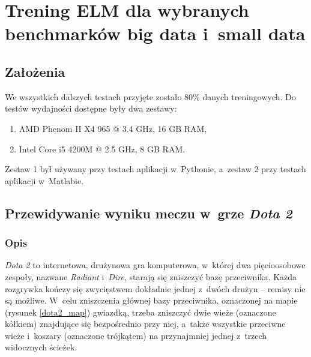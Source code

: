 \documentclass{article}
\begin{document}
\section{Trening ELM dla wybranych benchmarków big data i~small data}
\subsection{Założenia}
We wszystkich dalszych testach przyjęte zostało 80\% danych treningowych. Do testów wydajności dostępne były dwa zestawy:
\begin{enumerate}
\item AMD Phenom II X4 965 @ 3.4 GHz, 16 GB RAM,
\item Intel Core i5 4200M @ 2.5 GHz, 8 GB RAM.
\end{enumerate}
Zestaw 1 był używany przy testach aplikacji w~Pythonie, a~zestaw 2 przy testach aplikacji w~Matlabie.
\subsection{Przewidywanie wyniku meczu w~grze \textit{Dota 2}}
\subsubsection{Opis}
\textit{Dota 2} to internetowa, drużynowa gra komputerowa, w~której dwa pięcioosobowe zespoły, nazwane \textit{Radiant} i~\textit{Dire}, starają się zniszczyć bazę przeciwnika. Każda rozgrywka kończy się zwycięstwem dokładnie jednej z~dwóch drużyn -- remisy nie są możliwe. W~celu zniszczenia głównej bazy przeciwnika, oznaczonej na mapie (rysunek \ref{dota2_map}) gwiazdką, trzeba zniszczyć dwie wieże (oznaczone kółkiem) znajdujące się bezpośrednio przy niej, a~także wszystkie przeciwne wieże i~koszary (oznaczone trójkątem) na przynajmniej jednej z~trzech widocznych ścieżek.
\end{document}
